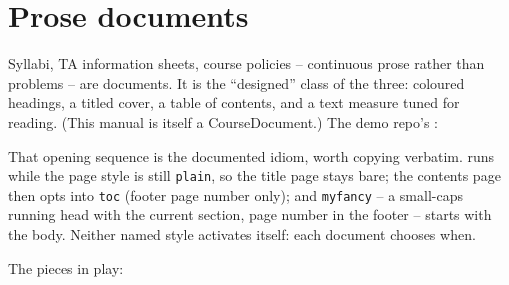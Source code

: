 \section{Prose documents}\label{sec:prose-documents}

Syllabi, TA information sheets, course policies -- continuous prose rather
than problems -- are  documents. It is the ``designed''
class of the three: coloured headings, a titled cover, a table of contents,
and a text measure tuned for reading. (This manual is itself a
CourseDocument.) The demo repo's :


That opening sequence is the documented idiom, worth copying verbatim.
 runs while the page style is still \texttt{plain}, so the
title page stays bare; the contents page then opts into \texttt{toc}
(footer page number only); and \texttt{myfancy} -- a small-caps running
head with the current section, page number in the footer -- starts with the
body. Neither named style activates itself: each document chooses when.

The pieces in play:

